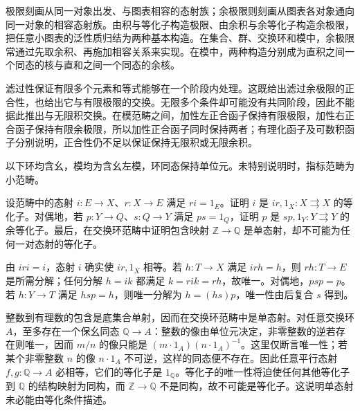 




\begin{chaptersummary}
	极限刻画从同一对象出发、与图表相容的态射族；余极限则刻画从图表各对象通向同一对象的相容态射族。由积与等化子构造极限、由余积与余等化子构造余极限，把任意小图表的泛性质归结为两种基本构造。在集合、群、交换环和模中，余极限常通过先取余积、再施加相容关系来实现。在模中，两种构造分别成为直积之间一个同态的核与直和之间一个同态的余核。

	\ProseParagraphBreak
	滤过性保证有限多个元素和等式能够在一个阶段内处理。这既给出滤过余极限的正合性，也给出它与有限极限的交换。无限多个条件却可能没有共同阶段，因此不能据此推出与无限积交换。在模范畴之间，加性左正合函子保持有限极限，加性右正合函子保持有限余极限，所以加性正合函子同时保持两者；有理化函子及可数积函子分别说明，正合性仍不足以保证保持无限积或无限余积。
\end{chaptersummary}

\BookExercises
以下环均含幺，模均为含幺左模，环同态保持单位元。未特别说明时，指标范畴为小范畴。

\begin{exercise}\label{b4:ex:02-equalizer-mono}
	设范畴中的态射 \(i:E\rightarrow X\)、\(r:X\rightarrow E\) 满足 \(ri=1_E\)。证明 \(i\) 是 \(ir,1_X:X\rightrightarrows X\) 的等化子。对偶地，若 \(p:Y\rightarrow Q\)、\(s:Q\rightarrow Y\) 满足 \(ps=1_Q\)，证明 \(p\) 是 \(sp,1_Y:Y\rightrightarrows Y\) 的余等化子。最后，在交换环范畴中证明包含映射 \(\mathbb Z\rightarrow\mathbb Q\) 是单态射，却不可能为任何一对态射的等化子。
\end{exercise}
\begin{solution}
	由 \(iri=i\)，态射 \(i\) 确实使 \(ir,1_X\) 相等。若 \(h:T\rightarrow X\) 满足 \(irh=h\)，则 \(rh:T\rightarrow E\) 是所需分解；任何分解 \(h=ik\) 都满足 \(k=rik=rh\)，故唯一。对偶地，\(psp=p\)。若 \(h:Y\rightarrow T\) 满足 \(hsp=h\)，则唯一分解为 \(h=(hs)p\)，唯一性由后复合 \(s\) 得到。

	整数到有理数的包含是底集合单射，因而在交换环范畴中是单态射。对任意交换环 \(A\)，至多存在一个保幺同态 \(\mathbb Q\rightarrow A\)：整数的像由单位元决定，非零整数的逆若存在则唯一，因而 \(m/n\) 的像只能是 \((m\cdot1_A)(n\cdot1_A)^{-1}\)。这里仅断言唯一性；若某个非零整数 \(n\) 的像 \(n\cdot1_A\) 不可逆，这样的同态便不存在。因此任意平行态射 \(f,g:\mathbb Q\rightarrow A\) 必相等，它们的等化子是 \(1_{\mathbb Q}\)。等化子的唯一性将迫使任何其他等化子到 \(\mathbb Q\) 的结构映射为同构，而 \(\mathbb Z\rightarrow\mathbb Q\) 不是同构，故不可能是等化子。这说明单态射未必能由等化条件描述。
\end{solution}


